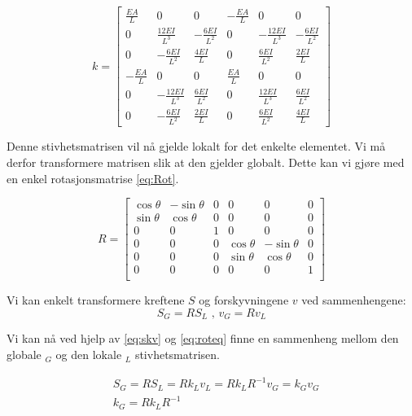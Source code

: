 \documentclass[10pt,a4paper, norsk]{article}
\begin{document}
\begin{equation} \label{eq:Lstivhet}
k  = \begin{bmatrix} 
\frac{EA}{L} & 0 & 0 & -\frac{EA}{L} & 0 & 0 \\
0 	& \frac{12EI}{L^3} & -\frac{6EI}{L^2} & 0 & -\frac{12EI}{L^3} & -\frac{6EI}{L^2} \\
0 	&	-\frac{6EI}{L^2} 	& 	\frac{4EI}{L} & 0 & \frac{6EI}{L^2} 	& 	\frac{2EI}{L}\\
-\frac{EA}{L} & 0 & 0 & \frac{EA}{L} & 0 & 0 \\
0 	& -\frac{12EI}{L^3} & \frac{6EI}{L^2} & 0 & \frac{12EI}{L^3} & \frac{6EI}{L^2} \\
0 & -\frac{6EI}{L^2} & \frac{2EI}{L} &0& \frac{6EI}{L^2} & \frac{4EI}{L}
\end{bmatrix}
\end{equation}




Denne stivhetsmatrisen vil nå gjelde lokalt for det enkelte elementet. Vi må derfor transformere matrisen slik at den gjelder globalt. Dette kan vi gjøre med en enkel rotasjonsmatrise \eqref{eq:Rot}. 

\begin{equation} \label{eq:Rot}
R  = \begin{bmatrix}
\cos \theta & -\sin \theta &   0&0&0&0\\[3pt]
\sin \theta & \cos \theta  & 0&0&0&0\\[3pt]
0 &0 & 1&0&0&0\\
0&0&0&\cos \theta & -\sin \theta&   0 \\[3pt]
0&0&0&\sin \theta & \cos \theta  & 0\\[3pt]
0&0&0&0 &0 & 1\\
\end{bmatrix} 
\end{equation}

Vi kan enkelt transformere kreftene $S$ og forskyvningene $v$ ved sammenhengene:
\begin{equation} \label{eq:roteq}
S_G=RS_L  \text{ , } v_G=Rv_L 
\end{equation}

Vi kan nå ved hjelp av \ref{eq:skv} og \ref{eq:roteq} finne en sammenheng mellom den globale $_G$ og den lokale $_L$ stivhetsmatrisen.

\begin{equation}
\begin{aligned}\label{eq:klkg}
& S_G=RS_L=Rk_Lv_L=Rk_LR^{-1}v_G=k_Gv_G \\
&k_G=Rk_LR^{-1}\\
\end{aligned}
\end{equation}
\end{document}
